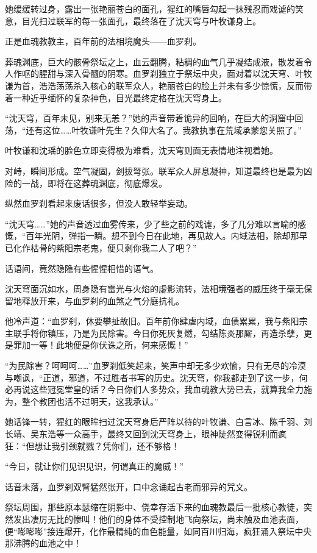 她缓缓转过身，露出一张艳丽苍白的面孔，猩红的嘴唇勾起一抹残忍而戏谑的笑意，目光扫过联军的每一张面孔，最终落在了沈天穹与叶牧谦身上。

正是血魂教教主，百年前的法相境魔头——血罗刹。

\vspace{2em}

葬魂渊底，巨大的骸骨祭坛之上，血云翻腾，粘稠的血气几乎凝结成液，散发着令人作呕的腥甜与深入骨髓的阴寒。血罗刹独立于祭坛中央，面对着以沈天穹、叶牧谦为首，浩浩荡荡杀入核心的联军众人，艳丽苍白的脸上并未有多少惊慌，反而带着一种近乎缅怀的复杂神色，目光最终定格在沈天穹身上。

“沈天穹，百年未见，别来无恙？”她的声音带着诡异的回响，在巨大的洞窟中回荡，“还有这位……叶牧谦叶先生？久仰大名了。我教执事在荒域承蒙您关照了。”

叶牧谦和沈瑶的脸色立即变得极为难看，沈天穹则面无表情地注视着她。

对峙，瞬间形成。空气凝固，剑拔弩张。联军众人屏息凝神，知道最终也是最为凶险的一战，即将在这葬魂渊底，彻底爆发。

纵然血罗刹看起来废话很多，但没人敢轻举妄动。

“沈天穹……”她的声音透过血雾传来，少了些之前的戏谑，多了几分难以言喻的感慨，“百年光阴，弹指一瞬。想不到今日在此地，再见故人。内域法相，除却那早已化作枯骨的紫阳宗老鬼，便只剩你我二人了吧？”

话语间，竟然隐隐有些惺惺相惜的语气。

沈天穹面沉如水，周身隐有雷光与火焰的虚影流转，法相境强者的威压终于毫无保留地释放开来，与血罗刹的血煞之气分庭抗礼。

他冷声道：“血罗刹，休要攀扯故旧。百年前你肆虐内域，血债累累，我与紫阳宗主联手将你镇压，乃是为民除害。今日你死灰复燃，勾结陈炎那厮，再造杀孽，更是罪加一等！此地便是你伏诛之所，何来感慨！”

“为民除害？呵呵呵……”血罗刹低笑起来，笑声中却无多少欢愉，只有无尽的冷漠与嘲讽，“正道，邪道，不过胜者书写的历史。沈天穹，你我都走到了这一步，何必再说这些冠冕堂皇的话？今日你们人多势众，我血魂教大势已去，就算我全力施为，整个教团也活不过明天，这我承认。”

她话锋一转，猩红的眼眸扫过沈天穹身后严阵以待的叶牧谦、白言冰、陈千羽、刘长靖、吴东浩等一众高手，最终又回到沈天穹身上，眼神陡然变得锐利而疯狂：“但想让我引颈就戮？凭你们，还不够格！

“今日，就让你们见识见识，何谓真正的魔威！”

话音未落，血罗刹双臂猛然张开，口中念诵起古老而邪异的咒文。

祭坛周围，那些原本瑟缩在阴影中、侥幸存活下来的血魂教最后一批核心教徒，突然发出凄厉无比的惨叫！他们的身体不受控制地飞向祭坛，尚未触及血池表面，便“嘭嘭嘭”接连爆开，化作最精纯的血色能量，如同百川归海，疯狂涌入祭坛中央那沸腾的血池之中！

